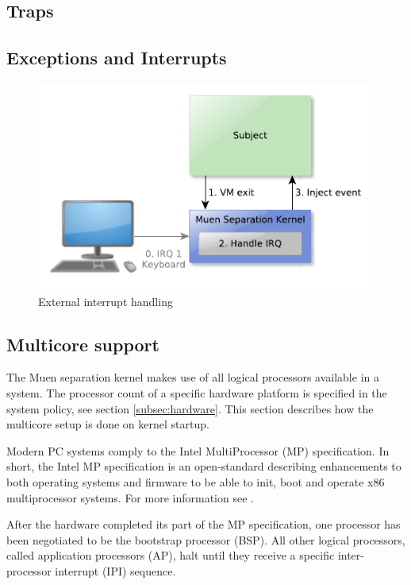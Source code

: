 \subsection{Traps}
\subsection{Exceptions and Interrupts}
\begin{figure}[h]
	\centering
	\includegraphics[scale=0.6]{images/external-interrupt}
	\caption{External interrupt handling}
	\label{fig:external-interrupt}
\end{figure}

\subsection{Multicore support}\label{subsec:mp-support}
The Muen separation kernel makes use of all logical processors available in a
system. The processor count of a specific hardware platform is specified in the
system policy, see section \ref{subsec:hardware}. This section describes how the
multicore setup is done on kernel startup.

Modern PC systems comply to the Intel MultiProcessor (MP)
specification. In short, the Intel MP specification is an open-standard
describing enhancements to both operating systems and firmware to be able to
init, boot and operate x86 multiprocessor systems. For more information see
\cite{intel:mp}.

After the hardware completed its part of the MP specification, one processor
has been negotiated to be the bootstrap processor (BSP). All other
logical processors, called application processors (AP), halt until
they receive a specific inter-processor interrupt (IPI) sequence.

